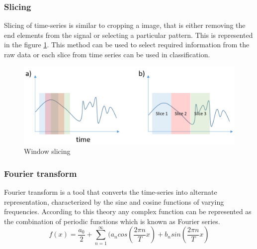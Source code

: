    
    
    \subsubsection{Slicing}
    Slicing of time-series is similar to cropping a image, that is either removing the end elements from the signal or selecting a particular pattern. This is represented in the figure \ref{l1}.
    This method can be used to select required information from the raw data or each slice from time series can be used in classification.
    
    \begin{figure}[h]
    	\centering
    	\includegraphics[width=0.75\linewidth]{images/MgfEa.png}
    	\caption{Window slicing \cite{le2016data}}
    	\label{l1}
    \end{figure}
    
    \subsubsection{Fourier transform}
    Fourier transform is a tool that converts the time-series  into alternate representation, characterized by the sine and cosine functions of varying frequencies. According to this theory any complex function can be represented as the combination of periodic functions which is known as Fourier series.
    \begin{equation}
    f(x) = \frac{a_0}{2}+\sum_{n=1}^{\infty}(a_ncos(\frac{2\pi n}{T}x)+b_nsin(\frac{2\pi n}{T}x)
    \label{e1}
    \end{equation}
    
